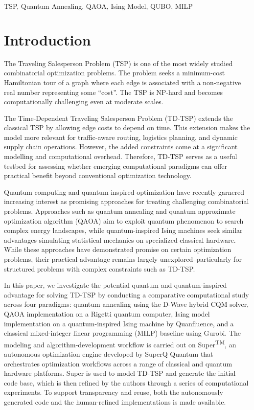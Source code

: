 \documentclass[conference]{IEEEtran}
\begin{document}
\begin{IEEEkeywords}
TSP, Quantum Annealing, QAOA, Ising Model, QUBO, MILP
\end{IEEEkeywords}

\section{Introduction}

The Traveling Salesperson Problem (TSP) is one of the most widely studied combinatorial optimization problems. The problem seeks a minimum-cost Hamiltonian tour of a graph where each edge is associated with a non-negative real number representing some ``cost''. The TSP is NP-hard and becomes computationally challenging even at moderate scales. 

The Time-Dependent Traveling Salesperson Problem (TD-TSP) extends the classical TSP by allowing edge costs to depend on time. This extension makes the model more relevant for traffic-aware routing, logistics planning,  and dynamic supply chain operations. However, the added constraints come at a significant modelling and computational overhead. Therefore, TD-TSP serves as a useful testbed for assessing whether emerging computational paradigms can offer practical benefit beyond conventional optimization technology.

Quantum computing and quantum-inspired optimization have recently garnered increasing interest as promising approaches for treating challenging combinatorial problems. Approaches such as quantum annealing and quantum approximate optimization algorithm (QAOA) aim to exploit quantum phenomenon to search complex energy landscapes, while quantum-inspired Ising machines seek similar advantages simulating statistical mechanics on specialized classical hardware. While these approaches have demonstrated promise on certain optimization problems, their practical advantage remains largely unexplored--particularly for structured problems with complex constraints such as TD-TSP. 

In this paper, we investigate the potential quantum and quantum-inspired advantage for solving TD-TSP by conducting a comparative computational study across four paradigms: quantum annealing using the D-Wave hybrid CQM solver, QAOA implementation on a Rigetti quantum computer, Ising model implementation on a quantum-inspired Ising machine by Quanfluence, and a classical mixed-integer linear programming (MILP) baseline using Gurobi. The modeling and algorithm-development workflow is carried out on Super\textsuperscript{TM}, an autonomous optimization engine developed by SuperQ Quantum that orchestrates optimization workflows across a range of classical and quantum hardware platforms. Super is used to model TD-TSP and generate the initial code base, which is then refined by the authors through a series of computational experiments. To support transparency and reuse, both the autonomously generated code and the human-refined implementations is made available.
\end{document}
